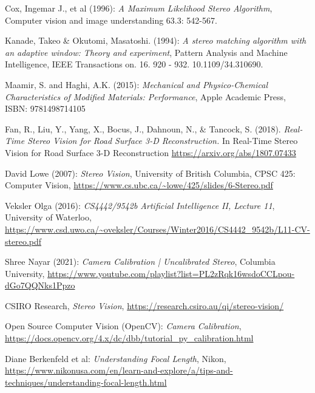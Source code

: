 \documentclass[11pt]{scrartcl}
\begin{document}
												\begin{thebibliography}{9}
													
													Cox, Ingemar J., et al (1996): \emph{A Maximum Likelihood Stereo Algorithm}, Computer vision and image understanding 63.3: 542-567.
													
													Kanade, Takeo & Okutomi, Masatoshi. (1994):  \emph{A stereo matching algorithm with an adaptive window: Theory and experiment}, Pattern Analysis and Machine Intelligence, IEEE Transactions on. 16. 920 - 932. 10.1109/34.310690. 
													
													Maamir, S. and Haghi, A.K. (2015): \emph{Mechanical and Physico-Chemical Characteristics of Modified Materials: Performance}, Apple Academic Press,
													ISBN: 9781498714105
													
													Fan, R., Liu, Y., Yang, X., Bocus, J., Dahnoun, N., & Tancock, S. (2018). \emph{Real-Time Stereo Vision for Road Surface 3-D Reconstruction.} In Real-Time Stereo Vision for Road Surface 3-D Reconstruction \url{https://arxiv.org/abs/1807.07433}
													
													David Lowe (2007): \emph{Stereo Vision}, University of British Columbia, CPSC 425: Computer Vision, 
													\url{https://www.cs.ubc.ca/~lowe/425/slides/6-Stereo.pdf}
													
													Veksler Olga  (2016): \emph{CS4442/9542b Artificial Intelligence II, Lecture 11}, University of Waterloo,
													\url{https://www.csd.uwo.ca/~oveksler/Courses/Winter2016/CS4442_9542b/L11-CV-stereo.pdf}
													
													Shree Nayar (2021): \emph{Camera Calibration | Uncalibrated Stereo}, Columbia University, 
													\url{https://www.youtube.com/playlist?list=PL2zRqk16wsdoCCLpou-dGo7QQNks1Ppzo}
													
													CSIRO Research,
													\textit{Stereo Vision}, \url{https://research.csiro.au/qi/stereo-vision/}
													  
													Open Source Computer Vision (OpenCV): \emph{Camera Calibration},
													\url{https://docs.opencv.org/4.x/dc/dbb/tutorial_py_calibration.html}
													
													Diane Berkenfeld et al: \emph{Understanding Focal Length}, Nikon,
													\url{https://www.nikonusa.com/en/learn-and-explore/a/tips-and-techniques/understanding-focal-length.html}
													

\end{thebibliography}
\end{document}
